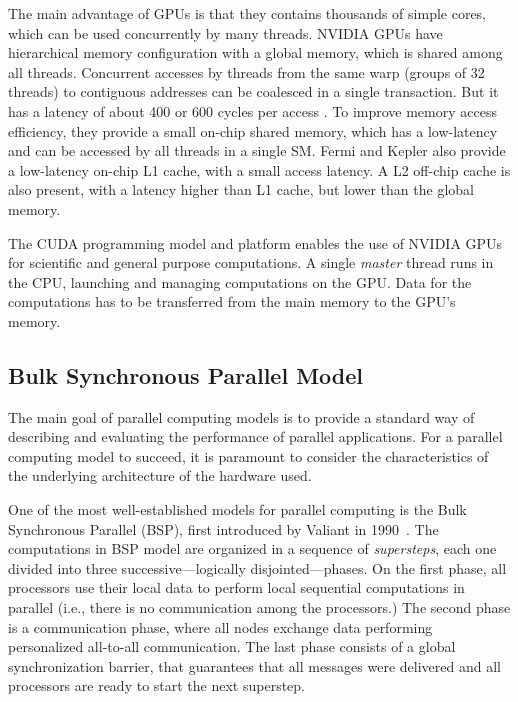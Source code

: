The main advantage of GPUs is that they contains thousands of simple cores, which can be used concurrently by many threads. NVIDIA GPUs have hierarchical memory configuration with a global memory, which is shared among all threads. Concurrent accesses by threads from the same warp (groups of 32 threads) to contiguous addresses can be coalesced in a single transaction. But it has a latency of about 400 or 600 cycles per access \cite{GPU:BenchMark}. To improve memory access efficiency, they provide a small on-chip shared memory, which has a low-latency and can be accessed by all threads in a single SM. Fermi and Kepler also provide a low-latency on-chip L1 cache, with a small access latency. A L2 off-chip cache is also present, with a latency higher than L1 cache, but lower than the global memory. %


The CUDA programming model and platform enables the use of NVIDIA GPUs for scientific and general purpose computations. A single \textit{master} thread runs in the CPU, launching and managing computations on the GPU. 
Data for the computations has to be transferred from the main memory to the GPU's memory.

\subsection{Bulk Synchronous Parallel Model}\label{ssec:AnalyticalModel}
The main goal of parallel computing models is to provide a standard way of describing and evaluating the performance of parallel applications. For a parallel computing model to succeed, it is paramount to consider the characteristics of the underlying architecture of the hardware used.

One of the most well-established models for parallel computing is the
Bulk Synchronous Parallel (BSP), first introduced by Valiant in
1990~\cite{Valiant:1990}. The computations in BSP model are organized in a sequence of \emph{supersteps}, each one divided into three successive---logically disjointed---phases. On the first phase, all processors use their local data to
perform local sequential computations in parallel (i.e., there is no communication among the processors.) The second phase is a communication phase, where all nodes exchange data performing personalized all-to-all
communication. The last phase consists of a global synchronization
barrier, that guarantees that all messages were delivered and all
processors are ready to start the next superstep. 


